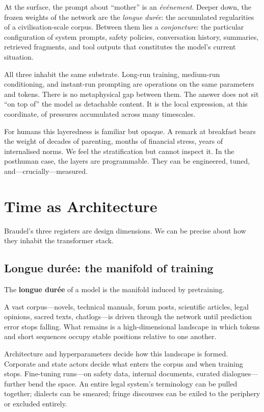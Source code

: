 At the surface, the prompt about ``mother'' is an \emph{\'ev\'enement}. Deeper down, the frozen weights of the network are the \emph{longue dur\'ee}: the accumulated regularities of a civilisation-scale corpus. Between them lies a \emph{conjoncture}: the particular configuration of system prompts, safety policies, conversation history, summaries, retrieved fragments, and tool outputs that constitutes the model's current situation.

All three inhabit the same substrate. Long-run training, medium-run conditioning, and instant-run prompting are operations on the same parameters and tokens. There is no metaphysical gap between them. The answer does not sit ``on top of'' the model as detachable content. It is the local expression, at this coordinate, of pressures accumulated across many timescales.

For humans this layeredness is familiar but opaque. A remark at breakfast bears the weight of decades of parenting, months of financial stress, years of internalised norms. We feel the stratification but cannot inspect it. In the posthuman case, the layers are programmable. They can be engineered, tuned, and---crucially---measured.

\section{Time as Architecture}

Braudel's three registers are design dimensions. We can be precise about how they inhabit the transformer stack.

\subsection{Longue dur\'ee: the manifold of training}

The \textbf{longue dur\'ee} of a model is the manifold induced by pretraining.

A vast corpus---novels, technical manuals, forum posts, scientific articles, legal opinions, sacred texts, chatlogs---is driven through the network until prediction error stops falling. What remains is a high-dimensional landscape in which tokens and short sequences occupy stable positions relative to one another.

Architecture and hyperparameters decide how this landscape is formed. Corporate and state actors decide what enters the corpus and when training stops. Fine-tuning runs---on safety data, internal documents, curated dialogues---further bend the space. An entire legal system's terminology can be pulled together; dialects can be smeared; fringe discourses can be exiled to the periphery or excluded entirely.

